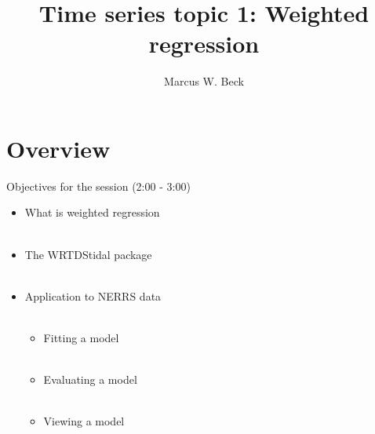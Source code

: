 \documentclass[xcolor=dvipsnames,serif]{beamer}\usepackage[]{graphicx}\usepackage[]{color}
\begin{document}
\title[WRTDS]{Time series topic 1: Weighted regression}

\author[M. Beck]{Marcus W. Beck}

\date{}









\section{Overview}

\begin{frame}{Objectives for the session (2:00 - 3:00)}
\begin{itemize}
\item What is weighted regression \\~\\
\item The WRTDStidal package \\~\\
\item Application to NERRS data \\~\\
\begin{itemize}
\item Fitting a model \\~\\
\item Evaluating a model \\~\\
\item Viewing a model\\~\\
\end{itemize}
\end{itemize}
\end{frame}
\end{document}
